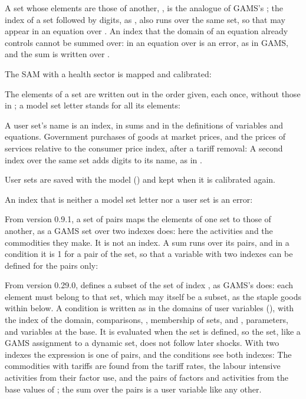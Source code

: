 A set whose elements are those of another, , is the
analogue of GAMS's ; the index of a set followed by digits, as
, also runs over the same set, so that 
may appear in an equation over . An index that the domain of an
equation already controls cannot be summed over:  in an
equation over  is an error, as in GAMS, and the sum is written over
.

The SAM with a health sector is mapped and calibrated:


The elements of a set are written out in the order given, each once, without
those in ; a model set letter stands for all its elements:


A user set's name is an index, in sums and in the definitions of variables
and equations. Government purchases of goods at market prices, and the prices
of services relative to the consumer price index, after a tariff removal:
A second index over the same set adds digits to its name, as in
.


User sets are saved with the model () and kept when it is
calibrated again.

An index that is neither a model set letter nor a user set is an error:


From version 0.9.1, a set of pairs maps the elements of one set to those of
another, as a GAMS set over two indexes does: here the activities and the
commodities they make. It is not an index. A sum runs over its pairs, and in
a condition it is 1 for a pair of the set, so that a variable with two indexes
can be defined for the pairs only:


From version 0.29.0,  \cmd{(}\cmd{)} defines a
subset of the set of index , as GAMS's  \cmd{(}\cmd{)}
does: each element must belong to that set, which may itself be a subset, as
the staple goods within  below. A condition is written as in the
domains of user variables (), with the index of the
domain, comparisons, \cmd{&} \cmd{|} \cmd{!}, membership of sets,
 and , parameters, and variables at the base. It is
evaluated when the set is defined, so the set, like a GAMS assignment to a
dynamic set, does not follow later shocks. With two indexes the expression is
one of pairs, and the conditions see both indexes:
The commodities with tariffs are found from the tariff rates, the labour
intensive activities from their factor use, and the pairs of factors and
activities from the base values of ; the sum over the pairs is a
user variable like any other.

